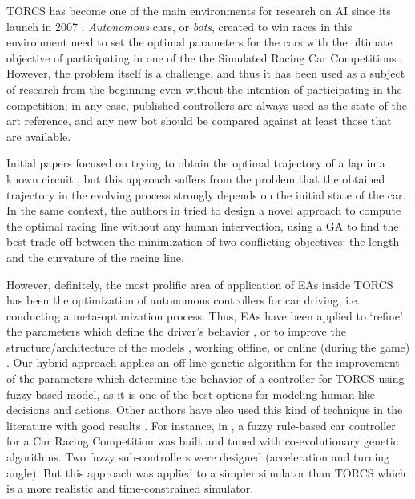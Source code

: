 \documentclass[conference]{IEEEtran}
\begin{document}
TORCS has become one of the
main environments for research on AI since its launch in 2007
\cite{torcs4}. {\em Autonomous} cars, or {\em bots}, created to win
races in this environment need to set the optimal parameters for the
cars \cite{Kole-ParamCarTunning12} with the ultimate objective of
participating in one of the the Simulated Racing Car Competitions
\cite{SimulatedCarRacing-2008,SimulatedCarRacing-2010}. However, the
problem itself is a challenge, and thus it has been used as a subject
of research from the beginning even without the intention of
participating in the competition; in any case, published controllers
are always used as the state of the art reference, and any new bot
should be compared against at least those that are available.


Initial papers focused on trying to obtain the 
optimal trajectory of a lap in a known circuit \cite{drivingGA2008},
but this approach suffers from the problem that the obtained
trajectory in the evolving process strongly depends on the initial
state of the car.  
In the same context, the authors in \cite{GaRaceLine2010} tried to design a novel approach to compute the optimal racing line without any human intervention, using a GA to find the best trade-off between
the minimization of two conflicting objectives: the length and
the curvature of the racing line.

However, definitely, the most prolific area of application of EAs
inside TORCS has been the optimization of autonomous controllers for
car driving, i.e. conducting a meta-optimization process. 
Thus, EAs have been applied to `refine' the parameters which define
the driver's behavior \cite{ButzCMAES09,SAES2012}, or to improve the
structure/architecture of the models \cite{SAES2012,neurone}, working
offline, or online (during the game)
\cite{TanOnline08,Cardamone_Online_NN}.
Our hybrid approach applies an off-line genetic algorithm for the
improvement of the parameters which determine the behavior of a
controller for TORCS using fuzzy-based model, as it is
one of the best options for modeling human-like decisions and
actions. Other authors have also used this kind of technique in the
literature with good results \cite{torcs2012}.  
For instance, in \cite{Guadarrama2008}, a fuzzy rule-based car
controller for a Car Racing Competition was built and tuned with
co-evolutionary genetic algorithms. Two fuzzy sub-controllers were
designed (acceleration and turning angle). But this approach was
applied to a simpler simulator than TORCS which is a more realistic
and time-constrained simulator. 
\end{document}
